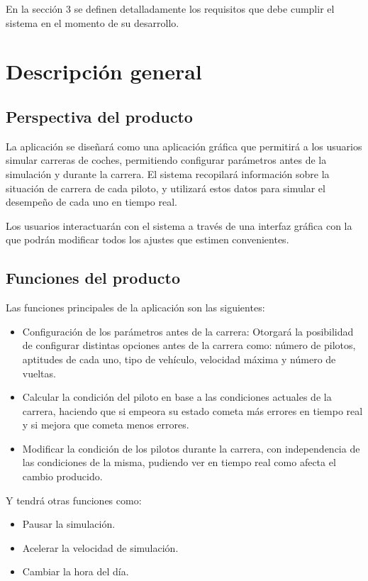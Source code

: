 En la sección 3 se definen detalladamente los requisitos que debe cumplir el sistema en el momento de su desarrollo.

\section{Descripción general}
\subsection{Perspectiva del producto}
La aplicación se diseñará como una aplicación gráfica que permitirá a los usuarios simular carreras de coches, permitiendo configurar parámetros antes de la simulación y durante la carrera. El sistema recopilará información sobre la situación de carrera de cada piloto, y utilizará estos datos para simular el desempeño de cada uno en tiempo real.

\bigskip

Los usuarios interactuarán con el sistema a través de una interfaz gráfica con la que podrán modificar todos los ajustes que estimen convenientes.

\subsection{Funciones del producto}

Las funciones principales de la aplicación son las siguientes:

\begin{itemize}
    \item Configuración de los parámetros antes de la carrera: Otorgará la posibilidad de configurar distintas opciones antes de la carrera como: número de pilotos, aptitudes de cada uno, tipo de vehículo, velocidad máxima y número de vueltas. 
    
    \item Calcular la condición del piloto en base a las condiciones actuales de la carrera, haciendo que si empeora su estado cometa más errores en tiempo real y si mejora que cometa menos errores.
    
    \item Modificar la condición de los pilotos durante la carrera, con independencia de las condiciones de la misma, pudiendo ver en tiempo real como afecta el cambio producido.
\end{itemize}

Y tendrá otras funciones como:

\begin{itemize}
    \item Pausar la simulación.
    \item Acelerar la velocidad de simulación.
    \item Cambiar la hora del día.
\end{itemize}

